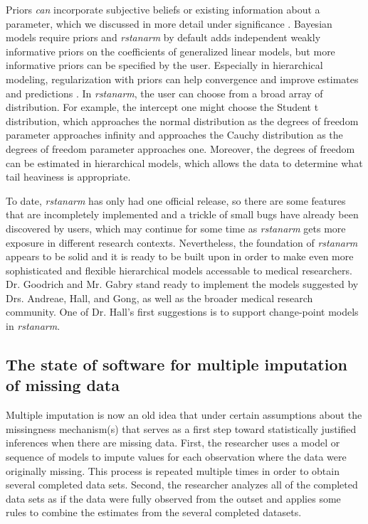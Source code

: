 \documentclass[11pt,notitlepage]{article}
\begin{document}
Priors \textit{can} incorporate subjective beliefs or existing information about a parameter,  
which we discussed in more detail under significance \cite{carlin1997bayes}. 
Bayesian models require priors and \textit{rstanarm} by default 
adds independent weakly informative priors on the coefficients of generalized linear models, 
but more informative priors can be specified by the user. Especially in hierarchical modeling, 
regularization with priors can help convergence and improve estimates and predictions
\cite{Gelman-Hill_2014}. In \textit{rstanarm}, the user can choose from 
a broad array of distribution. For example, the intercept one might choose the 
Student t distribution, which approaches the normal distribution as the 
degrees of freedom parameter approaches infinity and approaches the Cauchy distribution as the
degrees of freedom parameter approaches one. Moreover, the degrees of freedom can be estimated
in hierarchical models, which allows the data to determine what tail heaviness is appropriate.

To date, \textit{rstanarm} has only had one official release, so there are some features that are 
incompletely implemented and a trickle of small bugs have already been discovered by users, which 
may continue for some time as \textit{rstanarm} gets more exposure in different research contexts.
Nevertheless, the foundation of \textit{rstanarm} appears to be solid and it is ready to be built
upon in order to make even more sophisticated and flexible hierarchical models accessable to medical researchers.
Dr. Goodrich and Mr. Gabry stand ready to implement the models suggested by Drs. Andreae, Hall, and 
Gong, as well as the broader medical research community. One of Dr. Hall's first suggestions is to
support change-point models in \textit{rstanarm}.

\subsection*{The state of software for multiple imputation of missing data}

Multiple imputation is now an old idea that under certain assumptions about the missingness 
mechanism(s) that serves as a first step toward statistically justified inferences when there
are missing data. First, the researcher uses a model or sequence of models to impute values for 
each observation where the data were originally missing. This process is repeated multiple times
in order to obtain several completed data sets. Second, the researcher analyzes all of the 
completed data sets as if the data were fully observed from the outset and applies some rules to
combine the estimates from the several completed datasets.
\end{document}

